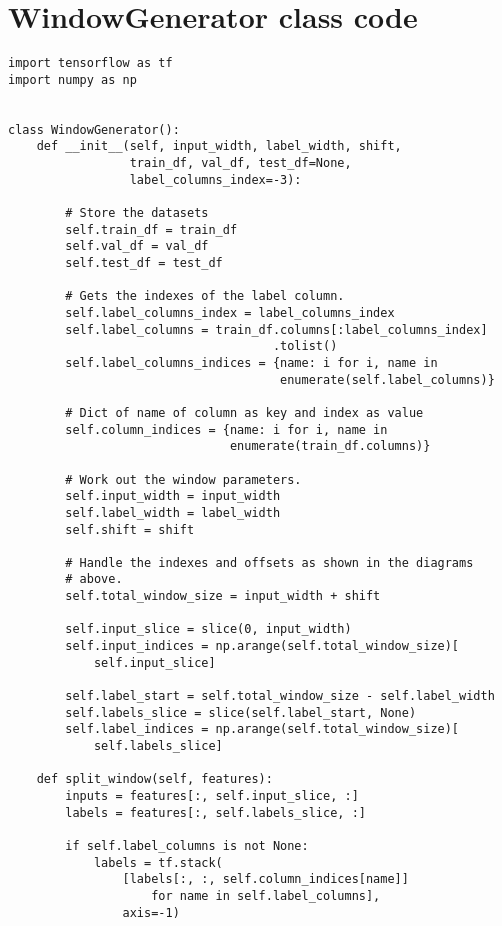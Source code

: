 \section{WindowGenerator class code}\label{app:window_generator}

\begin{verbatim}
import tensorflow as tf
import numpy as np


class WindowGenerator():
    def __init__(self, input_width, label_width, shift,
                 train_df, val_df, test_df=None,
                 label_columns_index=-3):

        # Store the datasets
        self.train_df = train_df
        self.val_df = val_df
        self.test_df = test_df

        # Gets the indexes of the label column.
        self.label_columns_index = label_columns_index
        self.label_columns = train_df.columns[:label_columns_index]
                                     .tolist()
        self.label_columns_indices = {name: i for i, name in
                                      enumerate(self.label_columns)}
    
        # Dict of name of column as key and index as value
        self.column_indices = {name: i for i, name in
                               enumerate(train_df.columns)}

        # Work out the window parameters.
        self.input_width = input_width
        self.label_width = label_width
        self.shift = shift
        
        # Handle the indexes and offsets as shown in the diagrams
        # above.
        self.total_window_size = input_width + shift

        self.input_slice = slice(0, input_width)
        self.input_indices = np.arange(self.total_window_size)[
            self.input_slice]

        self.label_start = self.total_window_size - self.label_width
        self.labels_slice = slice(self.label_start, None)
        self.label_indices = np.arange(self.total_window_size)[
            self.labels_slice]
            
    def split_window(self, features):
        inputs = features[:, self.input_slice, :]
        labels = features[:, self.labels_slice, :]
    
        if self.label_columns is not None:
            labels = tf.stack(
                [labels[:, :, self.column_indices[name]]
                    for name in self.label_columns],
                axis=-1)
    

\end{verbatim}
